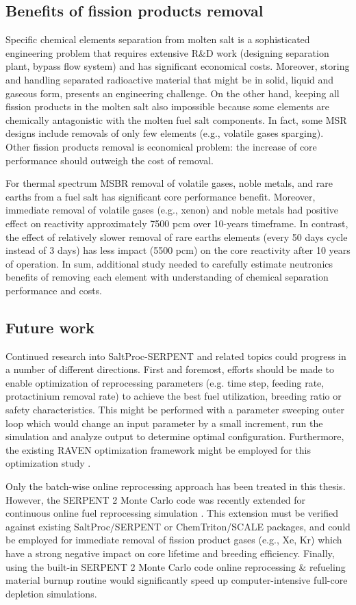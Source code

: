 \subsection{Benefits of fission products removal}
Specific chemical elements separation from molten salt is a sophisticated engineering problem that requires    extensive R\&D work (designing separation plant, bypass flow system) and has significant economical costs. Moreover, storing and handling separated radioactive material that might be in solid, liquid and gaseous form, presents an engineering challenge. On the other hand, keeping all fission products in the molten salt  also impossible because some elements are chemically antagonistic with the molten fuel salt components. In fact, some \gls{MSR} designs include removals of only few elements (e.g., volatile gases sparging). Other fission products removal is economical problem: the increase of core performance should outweigh the cost of removal.

For thermal spectrum \gls{MSBR} removal of volatile gases, noble metals, and rare earths from a fuel salt has significant core performance benefit. Moreover, immediate removal of volatile gases (e.g., xenon) and noble metals had positive effect on reactivity approximately 7500 pcm over 10-years timeframe. In contrast, the effect of relatively slower removal of rare earths elements (every 50 days cycle instead of 3 days) has less impact (5500 pcm) on the core reactivity after 10 years of operation. In sum, additional study needed to carefully estimate neutronics benefits of removing each element with understanding of chemical separation performance and costs.

\subsection{Future work}
Continued research into SaltProc-SERPENT and related topics could progress in a number of different directions. First and foremost, efforts should be made to enable optimization of reprocessing parameters (e.g. time step, feeding rate, protactinium removal rate) to achieve the best fuel utilization, breeding ratio or safety characteristics. This might be performed with a parameter sweeping outer loop which would change an input parameter by a small increment, run the simulation and analyze output to determine optimal configuration. Furthermore, the existing RAVEN optimization framework might be employed for this optimization study \cite{alfonsi_raven_2013}.

Only the batch-wise online reprocessing approach has been treated in this thesis. However, the SERPENT 2 Monte Carlo code was recently extended for continuous online fuel reprocessing simulation \cite{aufiero_extended_2013}. This extension must be verified against existing SaltProc/SERPENT or ChemTriton/SCALE packages, and could be employed for immediate removal of fission product gases (e.g., Xe, Kr) which have a strong negative impact on core lifetime and breeding efficiency. Finally, using the built-in SERPENT 2 Monte Carlo code online reprocessing \& refueling material burnup routine would significantly speed up computer-intensive full-core depletion simulations.